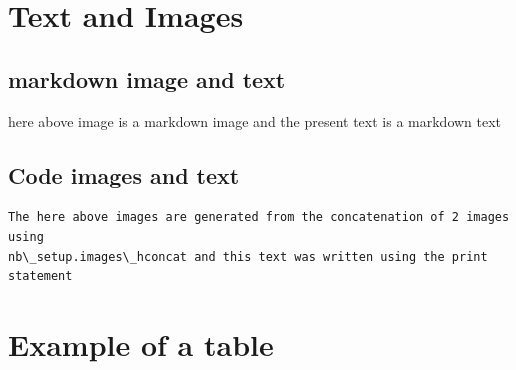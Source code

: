 \documentclass[reprint, floatfix, groupaddress, prb]{article}
\begin{document}
    
    

    \hypertarget{text-and-images}{%
\section{Text and Images}\label{text-and-images}}

    \hypertarget{markdown-image-and-text}{%
\subsection{markdown image and text}\label{markdown-image-and-text}}

    
        
    \begin{figure}
        \begin{center}\end{center}
        \caption{}
        \label{}
    \end{figure}
    
    

    here above image is a markdown image and the present text is a markdown
text

    \hypertarget{code-images-and-text}{%
\subsection{Code images and text}\label{code-images-and-text}}

    
        
    \begin{figure}
        \begin{center}\end{center}
        \caption{}
        \label{}
    \end{figure}
    
    

    \begin{Verbatim}[commandchars=\\\{\}]
 The here above images are generated from the concatenation of 2 images using
nb\_setup.images\_hconcat and this text was written using the print statement
    \end{Verbatim}

    \hypertarget{example-of-a-table}{%
\section{Example of a table}\label{example-of-a-table}}
\end{document}
